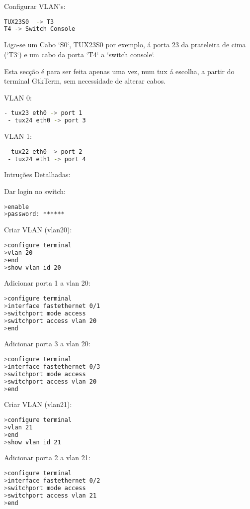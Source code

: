 Configurar VLAN's:

\begin{lstlisting}[language=bash]
TUX23S0  -> T3
T4 -> Switch Console
\end{lstlisting}
Liga-se um Cabo `S0`, TUX23S0 por exemplo, á porta 23 da prateleira de cima (`T3`) e um cabo da porta `T4` a `switch console`.

Esta secção é para ser feita apenas uma vez, num tux á escolha, a partir do terminal GtkTerm, sem necessidade de alterar cabos.

VLAN 0:
\begin{lstlisting}[language=bash]
 - tux23 eth0 -> port 1
 - tux24 eth0 -> port 3
\end{lstlisting}

VLAN 1:
\begin{lstlisting}[language=bash]
 - tux22 eth0 -> port 2
 - tux24 eth1 -> port 4
\end{lstlisting}

Intruções Detalhadas:

Dar login no switch:
\begin{lstlisting}[language=bash]
>enable
>password: ******
\end{lstlisting}

Criar VLAN (vlan20):
\begin{lstlisting}[language=bash]
>configure terminal
>vlan 20
>end
>show vlan id 20
\end{lstlisting}

Adicionar porta 1 a vlan 20:
\begin{lstlisting}[language=bash]
>configure terminal
>interface fastethernet 0/1
>switchport mode access
>switchport access vlan 20
>end
\end{lstlisting}

Adicionar porta 3 a vlan 20:
\begin{lstlisting}[language=bash]
>configure terminal
>interface fastethernet 0/3             
>switchport mode access
>switchport access vlan 20
>end
\end{lstlisting}

Criar VLAN (vlan21):
\begin{lstlisting}[language=bash]
>configure terminal
>vlan 21
>end
>show vlan id 21
\end{lstlisting}

Adicionar porta 2 a vlan 21:
\begin{lstlisting}[language=bash]
>configure terminal
>interface fastethernet 0/2             
>switchport mode access
>switchport access vlan 21
>end
\end{lstlisting}

